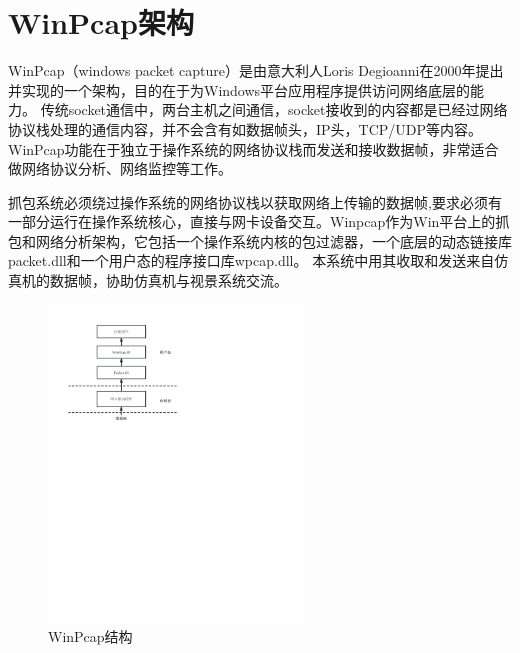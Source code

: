 \section{WinPcap架构}
WinPcap（windows packet capture）是由意大利人Loris Degioanni在2000年提出并实现的一个架构，目的在于为Windows平台应用程序提供访问网络底层的能力\cite{winpcap1}。
传统socket通信中，两台主机之间通信，socket接收到的内容都是已经过网络协议栈处理的通信内容，并不会含有如数据帧头，IP头，TCP/UDP等内容。WinPcap功能在于独立于操作系统的网络协议栈而发送和接收数据帧，非常适合做网络协议分析、网络监控等工作\cite{winpcap2}。
\par
抓包系统必须绕过操作系统的网络协议栈以获取网络上传输的数据帧,要求必须有一部分运行在操作系统核心，直接与网卡设备交互。Winpcap作为Win平台上的抓包和网络分析架构，它包括一个操作系统内核的包过滤器，一个底层的动态链接库packet.dll和一个用户态的程序接口库wpcap.dll\cite{winpcap3}。
本系统中用其收取和发送来自仿真机的数据帧，协助仿真机与视景系统交流。
\begin{figure}[h!]
    \begin{center}
        \includegraphics[width=0.6\textwidth]{pictures/winpcap.pdf}
        \caption{WinPcap结构}
        \label{wincapstruc}
    \end{center}
\end{figure}
